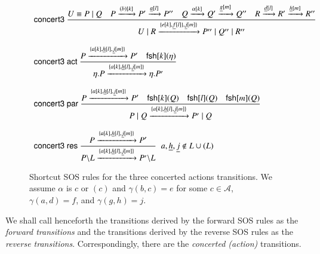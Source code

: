 {\begin{figure}[t] 
\[
\begin{array}{l}
\rulename{concert3}\ 
\Rule
{U\equiv P \paral Q \quad  P\xrightarrow{(b)[k]}P'\xrightarrow{\underline{a}[l]}P'' 
  \quad Q\xrightarrow{\alpha[k]}Q' \xrightarrow{\underline{g}[m]}Q''
  \quad R\xrightarrow{\underline{d}[l]} R'\xrightarrow{\underline{h}[m]}R''} %
{U \paral R\xrightarrow{\{e[k],\underline{f}[l]\},\underline{j}[m]\} }P'' \paral Q''\paral R''}\\[25pt]
\rulename{concert3 act}\
\Rule
{P \xrightarrow{\{{a}[k], \underline{h}[l], \underline{j}[m]\}} P' \quad \fresh{k}{\eta}}
{\eta.P \xrightarrow{\{{a}[k], \underline{h}[l], \underline{j}[m]\}} \eta.P'}\\[25pt]
\rulename{concert3 par}\
\Rule
{P \xrightarrow{\{{a}[k], \underline{h}[l], \underline{j}[m]\}} P'\quad \fresh{k}{Q} \quad \fresh{l}{Q}\quad \fresh{m}{Q}}
{P \paral Q \xrightarrow{\{{a}[k], \underline{h}[l], \underline{j}[m]\}} P' \paral Q}\\[25pt]
\rulename{concert3 res}\
\Rule
{P \xrightarrow{\{{a}[k], \underline{h}[l], \underline{j}[m]\}} P'}
{P\backslash L \xrightarrow{\{{a}[k], \underline{h}[l], \underline{j}[m]\}} P'\backslash L}\;\;  a, \underline{h}, \underline{j}  \notin L \cup (L)
%
\end{array}
\] 
\caption{Shortcut SOS rules for the three concerted actions transitions.  We assume $\alpha$ is $c$ or $(c)$ 
and $\gamma(b,c)=e$ for some $c\in \mathcal{A}$, $\gamma(a,d)=f$, and  $\gamma(g,h)=j$.}
\label{fig:xc3sos} 
\end{figure}


We shall call henceforth the transitions derived by the forward SOS rules as the \emph{forward transitions} 
and the transitions derived by the reverse SOS rules as the \emph{reverse transitions}.
Correspondingly, there are the \emph{concerted (action)} transitions. 
%
%
%
}
